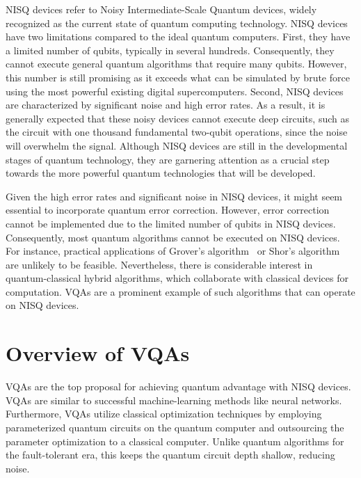 \documentclass[12pt,dvipdfmx,twoside,openright]{report}
\begin{document}
NISQ devices refer to Noisy Intermediate-Scale Quantum devices, widely recognized as the current state of quantum computing technology.
NISQ devices have two limitations compared to the ideal quantum computers.
First, they have a limited number of qubits, typically in several hundreds.
Consequently, they cannot execute general quantum algorithms that require many qubits.
However, this number is still promising as it exceeds what can be simulated by brute force using the most powerful existing digital supercomputers.
Second, NISQ devices are characterized by significant noise and high error rates.
As a result, it is generally expected that these noisy devices cannot execute deep circuits, such as the circuit with one thousand fundamental two-qubit operations, since the noise will overwhelm the signal.
Although NISQ devices are still in the developmental stages of quantum technology, they are garnering attention as a crucial step towards the more powerful quantum technologies that will be developed.

Given the high error rates and significant noise in NISQ devices, it might seem essential to incorporate quantum error correction. 
However, error correction cannot be implemented due to the limited number of qubits in NISQ devices.
Consequently, most quantum algorithms cannot be executed on NISQ devices. 
For instance, practical applications of Grover's algorithm~\cite{grover1996fast} or Shor's algorithm~\cite{shor1994algorithms} are unlikely to be feasible. 
Nevertheless, there is considerable interest in quantum-classical hybrid algorithms, which collaborate with classical devices for computation. 
VQAs are a prominent example of such algorithms that can operate on NISQ devices.

\section{Overview of VQAs}
VQAs are the top proposal for achieving quantum advantage with NISQ devices. 
VQAs are similar to successful machine-learning methods like neural networks.
Furthermore, VQAs utilize classical optimization techniques by employing parameterized quantum circuits on the quantum computer and outsourcing the parameter optimization to a classical computer.
Unlike quantum algorithms for the fault-tolerant era, this keeps the quantum circuit depth shallow, reducing noise.
\end{document}

